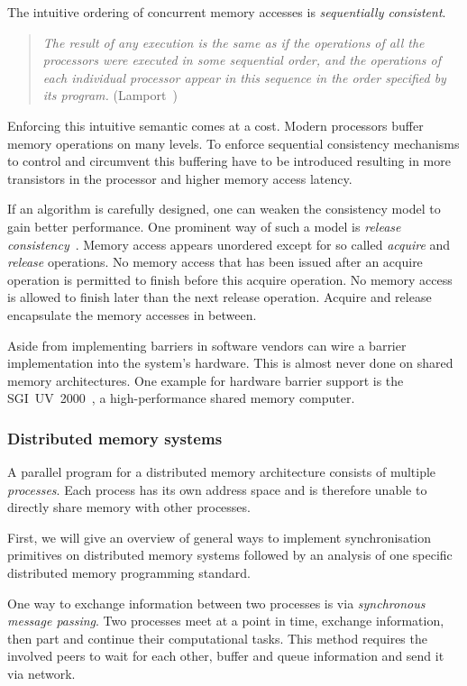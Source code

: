 \documentclass[a4paper, 10pt]{article}
\begin{document}
The intuitive ordering of concurrent memory accesses is \emph{sequentially consistent}.
\begin{quote}
	\textit{The result of any execution is the same as if the operations of all the processors were executed in some sequential order, and the operations of each individual processor appear in this sequence in the order specified by its program.} (Lamport~\cite{sequentialconsistency})
\end{quote}

Enforcing this intuitive semantic comes at a cost. Modern processors buffer memory operations on many levels. To enforce sequential consistency mechanisms to control and circumvent this buffering have to be introduced resulting in more transistors in the processor and higher memory access latency.

If an algorithm is carefully designed, one can weaken the consistency model to gain better performance. One prominent way of such a model is \textit{release consistency}~\cite{gha90}. Memory access appears unordered except for so called \emph{acquire} and \emph{release} operations. No memory access that has been issued after an acquire operation is permitted to finish before this acquire operation. No memory access is allowed to finish later than the next release operation. Acquire and release encapsulate the memory accesses in between.

Aside from implementing barriers in software vendors can wire a barrier implementation into the system's hardware. This is almost never done on shared memory architectures. One example for hardware barrier support is the SGI~UV~2000~\cite{sgiuv2000}, a high-performance shared memory computer.

\subsubsection{Distributed memory systems}
\label{sssec:background-means-distributed}
A parallel program for a distributed memory architecture consists of multiple \emph{processes}. Each process has its own address space and is therefore unable to directly share memory with other processes.

First, we will give an overview of general ways to implement synchronisation primitives on distributed memory systems followed by an analysis of one specific distributed memory programming standard.

One way to exchange information between two processes is via \emph{synchronous message passing}. Two processes meet at a point in time, exchange information, then part and continue their computational tasks. This method requires the involved peers to wait for each other, buffer and queue information and send it via network.
\end{document}
